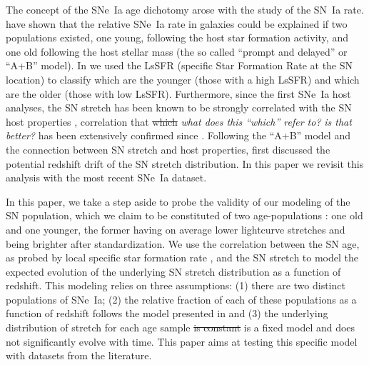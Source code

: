 \documentclass[]{aa} %
\newcommand{\nn}[1]{{\textcolor[rgb]{0.25, 0.50, 0}{#1}}}
\newcommand{\nnn}[1]{{\textcolor[rgb]{0.40, 0.0, 0.20}{#1}}}
\newcommand{\yc}[1]{{\textcolor{BrickRed}{#1}}}
\begin{document}
\nn{The concept of the SNe~Ia age dichotomy arose with the study of the SN~Ia
    rate. \cite{mannucci2005, scannapieco2005, sullivan2006, aubourg2008} have
    shown that the relative SNe~Ia rate in galaxies could be explained if two
    populations existed, one young, following the host star formation activity,
    and one old following the host stellar mass (the so called ``prompt and
    delayed'' or ``A+B'' model). In \cite{rigault2018} we used the \nnn{LsSFR
    (}specific Star Formation Rate at the SN location\nnn{)} to classify which
    are the younger (those with a high LsSFR) and which are the older (those
    with low LsSFR). Furthermore, since the first SNe~Ia host analyses, the SN
    stretch has been known to be strongly correlated with the SN host properties
    \citep{hamuy1996, hamuy2000}, \nnn{correlation that} \nnn{\sout{which}}
    \yc{\textit{what does this ``which'' refer to?}} \nnn{\textit{is that
    better?}} has been extensively confirmed since \citep[e.g.][]{neill2009,
sullivan2010, lampeitl2010, kelly2010, gupta2011, dandrea2011, childress2013,
rigault2013, pan2014, kim19}. Following the ``A+B'' model and the connection
between SN stretch and host properties, \cite{howell2007} first discussed the
potential redshift drift of the SN stretch distribution. In this paper we
revisit this analysis with the most recent SNe~Ia dataset.}

In this paper, we take a step aside to probe the validity of our modeling of the
SN population, which we claim to be constituted of two age-populations
\citep{rigault2013,rigault2015,rigault2018}: one old and one younger, the former
having on average lower lightcurve stretches and being brighter after
standardization. We use the correlation between the SN age, as probed by local
specific star formation rate \citep{rigault2018}, and the SN stretch to model
the expected evolution of the underlying SN stretch distribution as a function
of redshift. This modeling relies on three assumptions: (1) there are two
distinct populations of SNe~Ia; (2) the relative fraction of each of these
populations as a function of redshift follows the model presented in
\cite{rigault2018} and (3) the underlying distribution of stretch for each age
sample \sout{\yc{is constant}} \nn{is a fixed model} and does not significantly
evolve with time. This paper aims at testing this specific model with datasets
from the literature.
\end{document}
